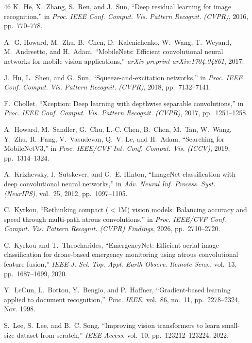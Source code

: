 \begin{thebibliography}{46}
K.~He, X.~Zhang, S.~Ren, and J.~Sun, ``Deep residual learning for image recognition,'' in \emph{Proc. IEEE Conf. Comput. Vis. Pattern Recognit. (CVPR)}, 2016, pp.~770--778.

A.~G. Howard, M.~Zhu, B.~Chen, D.~Kalenichenko, W.~Wang, T.~Weyand, M.~Andreetto, and H.~Adam, ``MobileNets: Efficient convolutional neural networks for mobile vision applications,'' \emph{arXiv preprint arXiv:1704.04861}, 2017.

J.~Hu, L.~Shen, and G.~Sun, ``Squeeze-and-excitation networks,'' in \emph{Proc. IEEE Conf. Comput. Vis. Pattern Recognit. (CVPR)}, 2018, pp.~7132--7141.

F.~Chollet, ``Xception: Deep learning with depthwise separable convolutions,'' in \emph{Proc. IEEE Conf. Comput. Vis. Pattern Recognit. (CVPR)}, 2017, pp.~1251--1258.

A.~Howard, M.~Sandler, G.~Chu, L.-C. Chen, B.~Chen, M.~Tan, W.~Wang, Y.~Zhu, R.~Pang, V.~Vasudevan, Q.~V. Le, and H.~Adam, ``Searching for MobileNetV3,'' in \emph{Proc. IEEE/CVF Int. Conf. Comput. Vis. (ICCV)}, 2019, pp.~1314--1324.

A.~Krizhevsky, I.~Sutskever, and G.~E. Hinton, ``ImageNet classification with deep convolutional neural networks,'' in \emph{Adv. Neural Inf. Process. Syst. (NeurIPS)}, vol.~25, 2012, pp.~1097--1105.

C.~Kyrkou, ``Rethinking compact ($<$1M) vision models: Balancing accuracy and speed through multi-path atrous convolutions,'' in \emph{Proc. IEEE/CVF Conf. Comput. Vis. Pattern Recognit. (CVPR) Findings}, 2026, pp.~2710--2720.

C.~Kyrkou and T.~Theocharides, ``EmergencyNet: Efficient aerial image classification for drone-based emergency monitoring using atrous convolutional feature fusion,'' \emph{IEEE J. Sel. Top. Appl. Earth Observ. Remote Sens.}, vol.~13, pp.~1687--1699, 2020. 

Y.~LeCun, L.~Bottou, Y.~Bengio, and P.~Haffner, ``Gradient-based learning applied to document recognition,'' \emph{Proc. IEEE}, vol.~86, no.~11, pp.~2278--2324, Nov. 1998. 

S.~Lee, S.~Lee, and B.~C. Song, ``Improving vision transformers to learn small-size dataset from scratch,'' \emph{IEEE Access}, vol.~10, pp.~123212--123224, 2022. 


\end{thebibliography}
